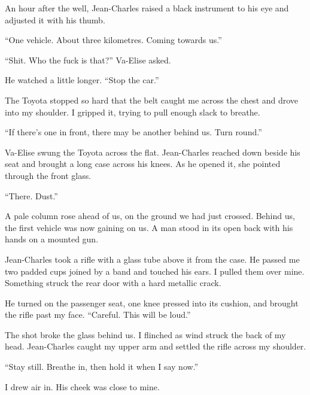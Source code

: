 An hour after the well, Jean-Charles raised a black instrument to his eye and adjusted it with his thumb.\par

``One vehicle. About three kilometres. Coming towards us.''\par

``Shit. Who the fuck is that?'' Va-Elise asked.\par

He watched a little longer. ``Stop the car.''\par

The Toyota stopped so hard that the belt caught me across the chest and drove into my shoulder. I gripped it, trying to pull enough slack to breathe.\par

``If there's one in front, there may be another behind us. Turn round.''\par

Va-Elise swung the Toyota across the flat. Jean-Charles reached down beside his seat and brought a long case across his knees. As he opened it, she pointed through the front glass.\par

``There. Dust.''\par

A pale column rose ahead of us, on the ground we had just crossed. Behind us, the first vehicle was now gaining on us. A man stood in its open back with his hands on a mounted gun.\par

Jean-Charles took a rifle with a glass tube above it from the case. He passed me two padded cups joined by a band and touched his ears. I pulled them over mine. Something struck the rear door with a hard metallic crack.\par

He turned on the passenger seat, one knee pressed into its cushion, and brought the rifle past my face. ``Careful. This will be loud.''\par

The shot broke the glass behind us. I flinched as wind struck the back of my head. Jean-Charles caught my upper arm and settled the rifle across my shoulder.\par

``Stay still. Breathe in, then hold it when I say now.''\par

I drew air in. His cheek was close to mine.\par

